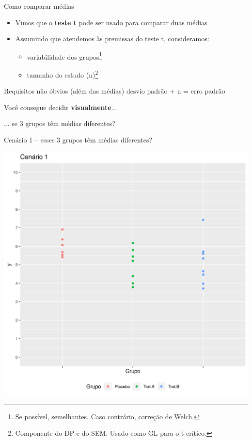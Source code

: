 \documentclass{beamer}
\begin{document}
\begin{frame}[label=requisito]{Como comparar médias}
  \begin{itemize}
    \footnotesize
  \item Vimos que o {\bf teste t} pode ser usado para comparar duas médias
    \bigskip
  \item Assumindo que atendemos às premissas do teste t, consideramos:
    \begin{itemize}
      \footnotesize
    \item variabilidade dos grupos\footnote{\scriptsize Se possível, semelhantes. Caso contrário, correção de Welch.}
    \item tamanho do estudo (n)\footnote{\scriptsize Componente do DP e do SEM. Usado como GL para o t crítico.}
    \end{itemize}
  \end{itemize}
  \bigskip
  \begin{block}{Requisitos não óbvios (além das médias)}
    desvio padrão + n = erro padrão
  \end{block}
\end{frame}

\begin{frame}
  \begin{center}
    \large
    Você consegue decidir {\bf visualmente}...

    \bigskip
    ... se 3 grupos têm médias diferentes?
  \end{center}
\end{frame}

\begin{frame}[label=cenario1]{\small Cenário 1 -- esses 3 grupos têm médias diferentes?}
  \begin{center}
    \includegraphics[height=.9\textheight]{Cap13-30/cenario1}
  \end{center}
\end{frame}
\end{document}
